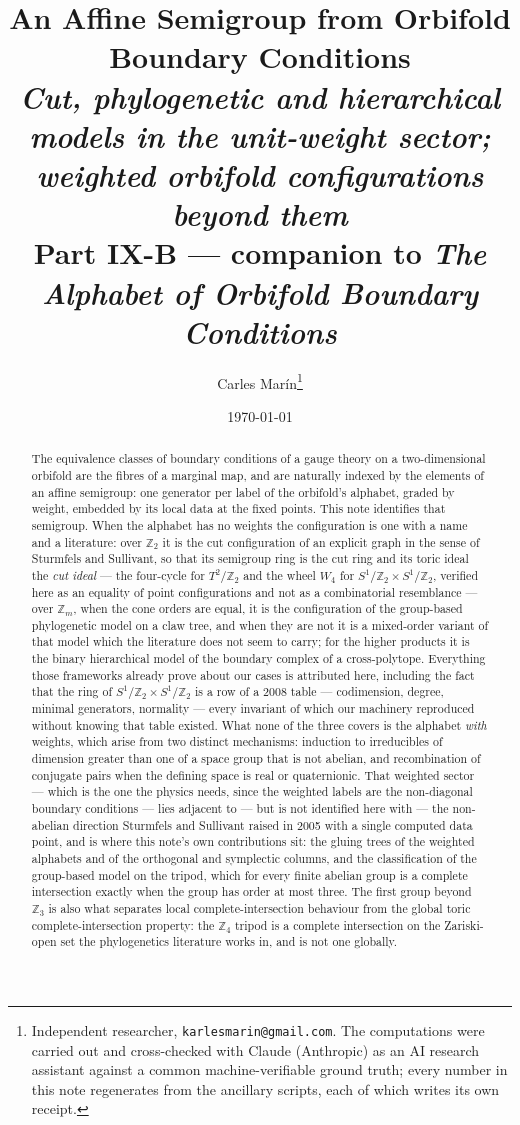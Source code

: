 \documentclass[11pt,a4paper]{article}
\title{\textbf{\Large An Affine Semigroup from Orbifold Boundary Conditions}\\[7pt]
\large\textnormal{\itshape Cut, phylogenetic and hierarchical models in the unit-weight sector;\\ weighted orbifold configurations beyond them}\\[8pt]
\normalsize\textnormal{Part IX-B --- companion to \emph{The Alphabet of Orbifold Boundary
Conditions}}}
\author{Carles Mar\'in\thanks{Independent researcher, \texttt{karlesmarin@gmail.com}.
The computations were carried out and cross-checked with Claude (Anthropic) as an AI research
assistant against a common machine-verifiable ground truth; every number in this note regenerates
from the ancillary scripts, each of which writes its own receipt.}}
\date{\today}
\theoremstyle{definition}
\newcommand{\ZZ}{\mathbb{Z}}
\begin{document}
\maketitle

\begin{abstract}
\noindent
The equivalence classes of boundary conditions of a gauge theory on a two-dimensional orbifold are
the fibres of a marginal map, and are naturally indexed by the elements of an affine semigroup: one
generator per label of the orbifold's alphabet, graded by weight, embedded by its local data at the
fixed points. This note identifies that semigroup. When
the alphabet has no weights the configuration is one with a name and a literature: over $\ZZ_2$
it is the cut configuration of an explicit graph in the sense of Sturmfels and Sullivant, so that
its semigroup ring is the cut ring and its toric ideal the \emph{cut ideal} --- the four-cycle for
$T^2/\ZZ_2$ and the wheel $W_4$ for $S^1/\ZZ_2\times S^1/\ZZ_2$, verified here as an equality of
point configurations and not as a combinatorial resemblance --- over $\ZZ_m$, when the cone orders
are equal, it is the configuration of the group-based phylogenetic model on a claw tree, and when
they are not it is a mixed-order variant of that model which the literature does not seem to carry;
for the higher products it is the binary hierarchical model of the boundary complex of a
cross-polytope. Everything those frameworks already prove about our
cases is attributed here, including the fact that the ring of $S^1/\ZZ_2\times S^1/\ZZ_2$ is a row
of a 2008 table --- codimension, degree, minimal generators, normality --- every invariant of which
our machinery reproduced without knowing that table existed. What none of the three
covers is the alphabet \emph{with} weights, which arise from two distinct mechanisms: induction to
irreducibles of dimension greater than one of a space group that is not abelian, and recombination of
conjugate pairs when the defining space is real or quaternionic. That weighted sector --- which is
the one the physics needs, since the weighted labels are the non-diagonal boundary conditions ---
lies adjacent to --- but is not identified here with --- the non-abelian direction Sturmfels
and Sullivant raised in 2005 with a single computed data point, and is where this note's own contributions sit:
the gluing trees of the weighted alphabets and of the orthogonal and symplectic columns, and the
classification of the group-based model on the tripod, which for every finite abelian group is a
complete intersection exactly when the group has order at most three. The first group beyond
$\ZZ_3$ is also what separates local complete-intersection behaviour from the global toric
complete-intersection property: the $\ZZ_4$ tripod is a complete intersection on the Zariski-open
set the phylogenetics literature works in, and is not one globally.
\end{abstract}
\end{document}
